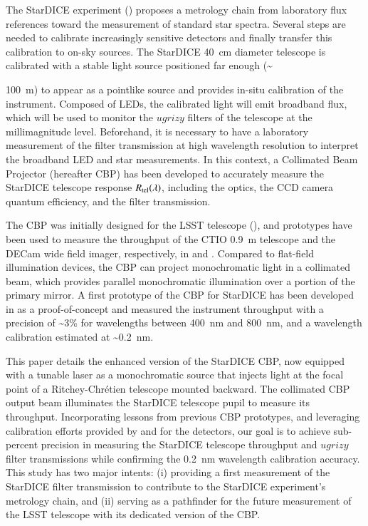 The StarDICE experiment (\citealt{Betoule_2023}) proposes a metrology chain from laboratory flux references toward the measurement of standard star spectra. Several steps are needed to calibrate increasingly sensitive detectors and finally transfer this calibration to on-sky sources. The StarDICE \SI{40}{\centi\meter} diameter telescope is calibrated with a stable light source positioned far enough (\textasciitilde {\SI{100}{\meter}) to appear as a pointlike source and provides in-situ calibration of the instrument. Composed of LEDs, the calibrated light will emit broadband flux, which will be used to monitor the $ugrizy$ filters of the \SD{} telescope at the millimagnitude level. Beforehand, it is necessary to have a laboratory measurement of the filter transmission at high wavelength resolution to interpret the broadband LED and star measurements. In this context, a Collimated Beam Projector (hereafter CBP) has been developed to accurately measure the StarDICE telescope response $R_{\mathrm{tel}}(\lambda)$, including the optics, the CCD camera quantum efficiency, and the filter transmission. 

The CBP was initially designed for the LSST telescope (\citealt{ingraham2016}), and prototypes have been used to measure the throughput of the CTIO \SI{0.9}{\meter} telescope and the DECam wide field imager, respectively, in \cite{coughlin2018} and \cite{coughlin2016}. Compared to flat-field illumination devices, the CBP can project monochromatic light in a collimated beam, which provides parallel monochromatic illumination over a portion of the primary mirror. A first prototype of the CBP for StarDICE has been developed in \cite{Mondrik_2023} as a proof-of-concept and measured the instrument throughput with a precision of \textasciitilde 3\% for wavelengths between \SI{400}{\nano\meter} and \SI{800}{\nano\meter}, and a wavelength calibration estimated at \textasciitilde \SI{0.2}{\nano\meter}. 

This paper details the enhanced version of the StarDICE CBP, now equipped with a tunable laser as a monochromatic source that injects light at the focal point of a Ritchey-Chrétien telescope mounted backward. The collimated CBP output beam illuminates the StarDICE telescope pupil to measure its throughput. Incorporating lessons from previous CBP prototypes, and leveraging calibration efforts provided by \cite{houston2008detectors} and \cite{solarcell} for the detectors, our goal is to achieve sub-percent precision in measuring the StarDICE telescope throughput and $ugrizy$ filter transmissions while confirming the \SI{0.2}{\nano\meter} wavelength calibration accuracy. This study has two major intents: (i) providing a first measurement of the StarDICE filter transmission to contribute to the StarDICE experiment's metrology chain, and (ii) serving as a pathfinder for the future measurement of the LSST telescope with its dedicated version of the CBP.

}
